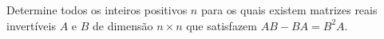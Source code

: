 Determine todos os inteiros positivos \(n\) para os quais existem matrizes reais invertíveis \(A\) e \(B\) de dimensão \(n \times n\) que satisfazem \(AB - BA = B^2A\).
